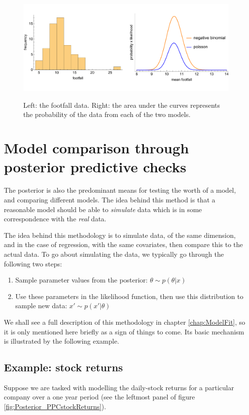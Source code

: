 \documentclass[11pt,fullpage]{book}
\begin{document}
\begin{figure}
\centering
\scalebox{0.45} 
{\includegraphics{Posterior_modelComparisonFootfall.pdf}}
\caption{Left: the footfall data. Right: the area under the curves represents the probability of the data from each of the two models.}\label{fig:Posterior_modelComparisonFootfall}
\end{figure}



\section{Model comparison through posterior predictive checks}
The posterior is also the predominant means for testing the worth of a model, and comparing different models. The idea behind this method is that a reasonable model should be able to \textit{simulate} data which is in some correspondence with the \textit{real} data. 

The idea behind this methodology is to simulate data, of the same dimension, and in the case of regression, with the same covariates, then compare this to the actual data. To go about simulating the data, we typically go through the following two steps:

\begin{enumerate}
\item Sample parameter values from the posterior: $\theta\sim p(\theta|x)$
\item Use these parameters in the likelihood function, then use this distribution to sample new data: $x'\sim p(x'|\theta)$
\end{enumerate}

We shall see a full description of this methodology in chapter \ref{chap:ModelFit}, so it is only mentioned here briefly as a sign of things to come. Its basic mechanism is illustrated by the following example.

\subsection{Example: stock returns}
Suppose we are tasked with modelling the daily-stock returns for a particular company over a one year period (see the leftmost panel of figure \ref{fig:Posterior_PPCstockReturns}). 
\end{document}
